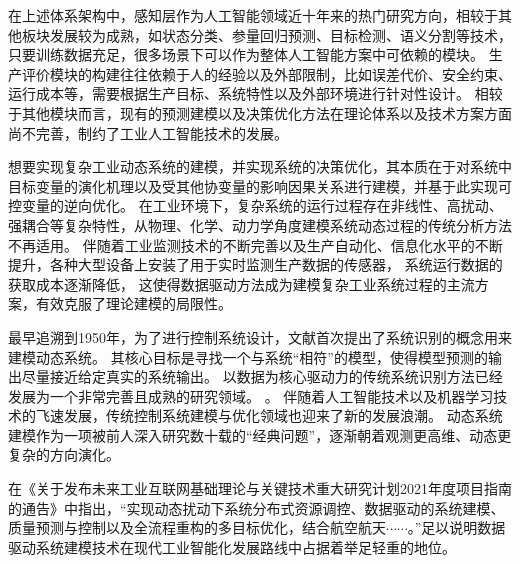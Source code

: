 在上述体系架构中，感知层作为人工智能领域近十年来的热门研究方向，相较于其他板块发展较为成熟，如状态分类、参量回归预测、目标检测、语义分割等技术，只要训练数据充足，很多场景下可以作为整体人工智能方案中可依赖的模块。
生产评价模块的构建往往依赖于人的经验以及外部限制，比如误差代价、安全约束、运行成本等，需要根据生产目标、系统特性以及外部环境进行针对性设计。
相较于其他模块而言，现有的预测建模以及决策优化方法在理论体系以及技术方案方面尚不完善，制约了工业人工智能技术的发展。

想要实现复杂工业动态系统的建模，并实现系统的决策优化，其本质在于对系统中目标变量的演化机理以及受其他协变量的影响因果关系进行建模，并基于此实现可控变量的逆向优化。
在工业环境下，复杂系统的运行过程存在非线性、高扰动、强耦合等复杂特性，从物理、化学、动力学角度建模系统动态过程的传统分析方法不再适用。
伴随着工业监测技术的不断完善以及生产自动化、信息化水平的不断提升，各种大型设备上安装了用于实时监测生产数据的传感器，
系统运行数据的获取成本逐渐降低，
这使得数据驱动方法成为建模复杂工业系统过程的主流方案，有效克服了理论建模的局限性。

最早追溯到1950年，为了进行控制系统设计，文献\cite{zadeh1956identification}首次提出了系统识别的概念用来建模动态系统。
其核心目标是寻找一个与系统“相符”的模型，使得模型预测的输出尽量接近给定真实的系统输出。
以数据为核心驱动力的传统系统识别方法已经发展为一个非常完善且成熟的研究领域。
\cite{le2013system,gevers2006personal,ljung2008perspectives,ljung2011four,Ljung2020}。
伴随着人工智能技术以及机器学习技术的飞速发展，传统控制系统建模与优化领域也迎来了新的发展浪潮。
动态系统建模作为一项被前人深入研究数十载的“经典问题”，逐渐朝着观测更高维、动态更复杂的方向演化。

在《关于发布未来工业互联网基础理论与关键技术重大研究计划2021年度项目指南的通告》中指出，“实现动态扰动下系统分布式资源调控、数据驱动的系统建模、质量预测与控制以及全流程重构的多目标优化，结合航空航天$\cdots\cdots$。”足以说明数据驱动系统建模技术在现代工业智能化发展路线中占据着举足轻重的地位。

